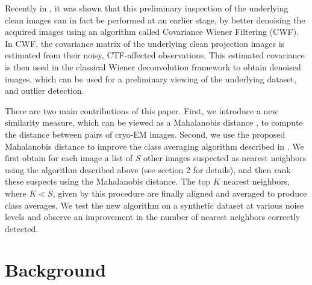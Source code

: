 \documentclass{article}
\begin{document}
Recently in \cite{cwf}, it was shown that this preliminary inspection of the underlying clean images can in fact be performed at an earlier stage, by better denoising the acquired images using an algorithm called Covariance Wiener Filtering (CWF). In CWF, the covariance matrix of the underlying clean projection images is estimated from their noisy, CTF-affected observations. This estimated covariance is then used in the classical Wiener deconvolution framework to obtain denoised images, which can be used for a preliminary viewing of the underlying dataset, and outlier detection. 

There are two main contributions of this paper. First, we introduce a new similarity measure, which can be viewed as a Mahalanobis distance \cite{mah}, to compute the distance between pairs of cryo-EM images. Second, we use the proposed Mahalanobis distance to improve the class averaging algorithm described in \cite{zhao}. We first obtain for each image a list of $S$ other images suspected as nearest neighbors using the algorithm described above (see section 2 for details), and then rank these suspects using the Mahalanobis distance. The top $K$ nearest neighbors, where $K<S$, given by this procedure are finally aligned and averaged to produce class averages. We test the new algorithm on a synthetic dataset at various noise levels and observe an improvement in the number of nearest neighbors correctly detected.

\section{Background}
\end{document}
